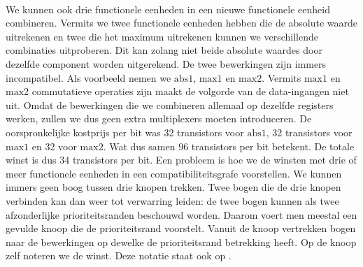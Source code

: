 \paragraph{}
We kunnen ook drie functionele eenheden in een nieuwe functionele eenheid combineren. Vermits we twee functionele eenheden hebben die de absolute waarde uitrekenen en twee die het maximum uitrekenen kunnen we verschillende combinaties uitproberen. Dit kan zolang niet beide absolute waardes door dezelfde component worden uitgerekend. De twee bewerkingen zijn immers incompatibel. Als voorbeeld nemen we $\mbox{abs1}$, $\mbox{max1}$ en $\mbox{max2}$. Vermits $\mbox{max1}$ en $\mbox{max2}$ commutatieve operaties zijn maakt de volgorde van de data-ingangen niet uit. Omdat de bewerkingen die we combineren allemaal op dezelfde registers werken, zullen we dus geen extra multiplexers moeten introduceren. De oorspronkelijke kostprijs per bit was 32 transistors voor $\mbox{abs1}$, 32 transistors voor $\mbox{max1}$ en 32 voor $\mbox{max2}$. Wat dus samen $96$ transistors per bit betekent. De totale winst is dus $34$ transistors per bit. Een probleem is hoe we de winsten met drie of meer functionele eenheden in een compatibiliteitsgrafe voorstellen. We kunnen immers geen boog tussen drie knopen trekken. Twee bogen die de drie knopen verbinden kan dan weer tot verwarring leiden: de twee bogen kunnen als twee afzonderlijke prioriteitsranden beschouwd worden. Daarom voert men meestal een gevulde knoop die de prioriteitsrand voorstelt. Vanuit de knoop vertrekken bogen naar de bewerkingen op dewelke de prioriteitsrand betrekking heeft. Op de knoop zelf noteren we de winst. Deze notatie staat ook op .
